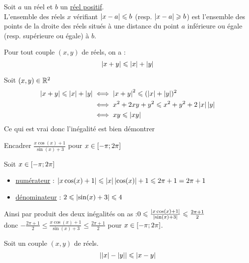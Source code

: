 \begin{defprop}
	Soit \(a\) un réel et \(b\) un \underline{réel positif}. \\
	L’ensemble des réels \(x\) vérifiant \(\left\lvert x-a\right\rvert\leqslant b\) (resp. \(\left\lvert x-a\right\rvert\geqslant b \)) est l’ensemble des points de la droite des
	réels situés à une distance du point \(a\) inférieure ou égale (resp. supérieure ou égale) à \(b\).
\end{defprop}

\begin{prop}
	Pour tout couple \((x,y)\) de réels, on a :
	\[\left\lvert x+y\right\rvert\leqslant \left\lvert x\right\rvert+\left\lvert y\right\rvert\]
\end{prop}

\begin{dem} 
	Soit \((x,y) \in \mathbb{R}^2\)
	\begin{align*}
		\left\lvert x+y\right\rvert\leqslant \left\lvert x\right\rvert+\left\lvert y\right\rvert & \iff \left\lvert x+y\right\rvert^2\leqslant (\left\lvert x\right\rvert+\left\lvert y\right\rvert)^2      \\
		                              & \iff x^2+2xy+y^2 \leqslant x^2+y^2+2\left\lvert x\right\rvert\left\lvert y\right\rvert \\
		                              & \iff xy\leqslant \left\lvert xy\right\rvert
	\end{align*}
	Ce qui est vrai donc l'inégalité est bien démontrer
\end{dem}

\begin{exoex}
	Encadrer \(\frac{x\cos(x)+1}{\sin(x)+3}\) pour \(x\in\left[-\pi;2\pi\right]\)
\end{exoex}

\begin{corr}
	Soit \(x\in\left[-\pi;2\pi\right]\)
	\begin{itemize}

		\item \underline{numérateur} : \(\left\lvert x\cos(x)+1\right\rvert\leqslant \left\lvert x\right\rvert\left\lvert\cos(x)\right\rvert+1\leqslant 2\pi+1 = 2\pi+1\)
		\item \underline{dénominateur} : \(2\leqslant\left\lvert\sin(x)+3\right\rvert\leqslant 4\)

	\end{itemize}
	Ainsi par produit des deux inégalités on as :\(0\leqslant\frac{\left\lvert x\cos(x)+1\right\rvert}{\left\lvert\sin(x)+3\right\rvert}\leqslant \frac{2\pi+1}{2} \)\\
	donc \(-\frac{2\pi+1}{2} \leq \frac{x\cos(x)+1}{\sin(x)+3} \leq \frac{2\pi+1}{2}\) pour \(x\in\left[-\pi;2\pi\right]\).
\end{corr}

\begin{prop}
	Soit un couple \((x,y)\) de réels.
	\[\left\lvert\left\lvert x\right\rvert-\left\lvert y\right\rvert\right\rvert \leqslant\left\lvert x-y\right\rvert\]
\end{prop}


